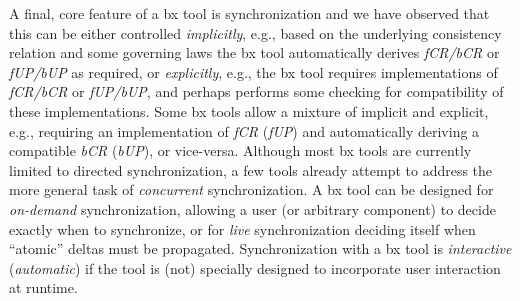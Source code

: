 A final, core feature of a bx tool is synchronization and we have observed that this can be either controlled \emph{implicitly}, e.g., based on the underlying consistency relation and some governing laws the bx tool automatically derives \emph{fCR/bCR} or \emph{fUP/bUP} as required, or \emph{explicitly}, e.g., the bx tool requires implementations of \emph{fCR/bCR} or \emph{fUP/bUP}, and perhaps performs some checking for compatibility of these implementations.
Some bx tools allow a mixture of implicit and explicit, e.g., requiring an implementation of \emph{fCR} (\emph{fUP}) and automatically deriving a compatible \emph{bCR} (\emph{bUP}), or vice-versa.
Although most bx tools are currently limited to directed synchronization, a few tools already attempt to address the more general task of \emph{concurrent} synchronization.
A bx tool can be designed for \emph{on-demand} synchronization, allowing a user (or arbitrary component) to decide exactly when to synchronize, or for \emph{live} synchronization deciding itself when ``atomic'' deltas must be propagated.
Synchronization with a bx tool is \emph{interactive} (\emph{automatic}) if the tool is (not) specially designed to incorporate user interaction at runtime.